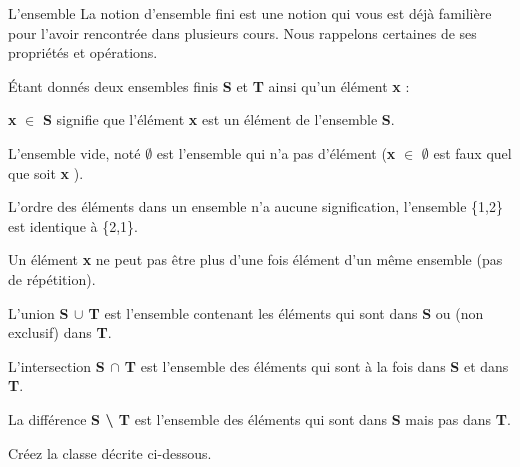 \begin{Exercice}{L'ensemble}
		La notion d’ensemble fini est une notion qui vous est déjà 
		familière pour l’avoir rencontrée dans plusieurs cours. Nous rappelons
		certaines de ses propriétés et opérations. 
				
		Étant donnés deux ensembles
		finis \textbf{S} et \textbf{T} ainsi qu’un élément \textbf{x} :

		\begin{liste}
		\item 
			\textbf{x} {${\in}$} \textbf{S} signifie que l’élément \textbf{x}
			est un élément de l’ensemble \textbf{S}.
		\item 
			L’ensemble vide, noté \textbf{${\emptyset}$} 
			est l’ensemble qui n’a pas d’élément 
			(\textbf{x} {${\in}$} \textbf{${\emptyset}$} 
			est faux quel que soit \textbf{x} ).
		\item 
			L’ordre des éléments dans un ensemble n’a
			aucune signification, l’ensemble \{1,2\} est
			identique à \{2,1\}.
		\item 
			Un élément \textbf{x} ne peut
			pas être plus d’une fois élément d’un même ensemble 
			(pas de répétition).
		\item 
			L’union \textbf{S ${\cup}$ T} 
			est l’ensemble contenant les éléments qui sont dans 
			\textbf{S} ou (non exclusif) dans \textbf{T}.
		\item 
			L’intersection \textbf{S ${\cap}$ T} 
			est l’ensemble des éléments qui sont à la fois 
			dans \textbf{S} et dans \textbf{T}.
		\item 
			La différence \textbf{S {\textbackslash} T} 
			est l’ensemble des éléments qui sont 
			dans \textbf{S} mais pas dans \textbf{T}.
		\end{liste}
		
		Créez la classe 
		décrite ci-dessous.
		
	\bigskip


\end{Exercice}
